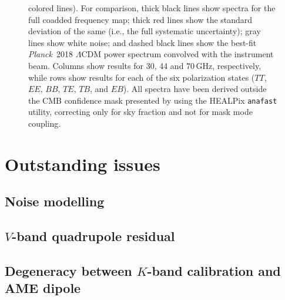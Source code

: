 \documentclass[twocolumn]{../../common/aa}
\def\Planck{\emph{Planck}}
\begin{document}
\begin{figure}
{{      colored lines}). For comparison, thick black lines show spectra
    for the full coadded frequency map; thick red lines show the
    standard deviation of the same (i.e., the full systematic
    uncertainty); gray lines show white noise; and dashed black lines
    show the best-fit \Planck\ 2018 $\Lambda$CDM power spectrum
    convolved with the instrument beam. Columns show results for 30,
    44 and 70\,GHz, respectively, while rows show results for each of
    the six polarization states ($TT$, $EE$, $BB$, $TE$, $TB$, and
    $EB$). All spectra have been derived outside the CMB confidence
    mask presented by \citet{bp13} using the HEALPix \texttt{anafast}
    utility, correcting only for sky fraction and not for mask mode
    coupling. }
  \label{fig:corrmap_powspec_stddev}
\end{figure}

















\section{Outstanding issues}
\label{sec:issues}


\subsection{Noise modelling}
\label{sec:noisemodel}


\subsection{$V$-band quadrupole residual}
\label{sec:quadres}


\subsection{Degeneracy between $K$-band calibration and AME dipole}
\label{sec:quadres}
\end{document}
